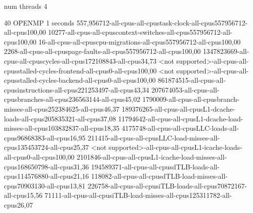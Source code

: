 num threads 4

40
OPENMP
1 seconds
557,956712-all-cpus-all-cpustask-clock-all-cpus557956712-all-cpus100,00
10277-all-cpus-all-cpuscontext-switches-all-cpus557956712-all-cpus100,00
16-all-cpus-all-cpuscpu-migrations-all-cpus557956712-all-cpus100,00
2268-all-cpus-all-cpuspage-faults-all-cpus557956712-all-cpus100,00
1347823669-all-cpus-all-cpuscycles-all-cpus172108843-all-cpus34,73
<not supported>-all-cpus-all-cpusstalled-cycles-frontend-all-cpus0-all-cpus100,00
<not supported>-all-cpus-all-cpusstalled-cycles-backend-all-cpus0-all-cpus100,00
861874515-all-cpus-all-cpusinstructions-all-cpus221253497-all-cpus43,34
207674053-all-cpus-all-cpusbranches-all-cpus236563144-all-cpus45,02
1790009-all-cpus-all-cpusbranch-misses-all-cpus252384625-all-cpus46,37
189376265-all-cpus-all-cpusL1-dcache-loads-all-cpus205835321-all-cpus37,08
11794642-all-cpus-all-cpusL1-dcache-load-misses-all-cpus103832837-all-cpus18,35
4175748-all-cpus-all-cpusLLC-loads-all-cpus96868383-all-cpus16,95
211415-all-cpus-all-cpusLLC-load-misses-all-cpus135453724-all-cpus25,37
<not supported>-all-cpus-all-cpusL1-icache-loads-all-cpus0-all-cpus100,00
2101846-all-cpus-all-cpusL1-icache-load-misses-all-cpus168650798-all-cpus31,36
194589371-all-cpus-all-cpusdTLB-loads-all-cpus114576880-all-cpus21,16
118082-all-cpus-all-cpusdTLB-load-misses-all-cpus70903130-all-cpus13,81
226758-all-cpus-all-cpusiTLB-loads-all-cpus70872167-all-cpus15,56
71111-all-cpus-all-cpusiTLB-load-misses-all-cpus125311782-all-cpus26,07
